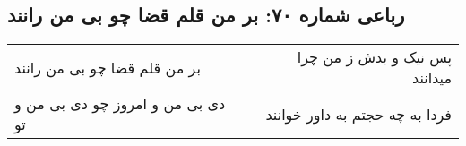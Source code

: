 \begin{center}
\section*{رباعی شماره ۷۰: بر من قلم قضا چو بی من رانند}
\label{sec:sh070}
\begin{longtable}{l p{0.5cm} r}
بر من قلم قضا چو بی من رانند
&&
پس نیک و بدش ز من چرا میدانند
\\
دی بی من و امروز چو دی بی من و تو
&&
فردا به چه حجتم به داور خوانند
\\
\end{longtable}
\end{center}

